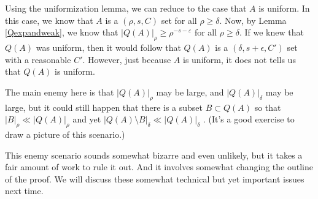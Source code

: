 \documentclass[12pt]{amsart}
\begin{document}
Using the uniformization lemma,  we can reduce to the case that $A$ is uniform.   In this case,  we know that $A$ is a $(\rho, s, C)$ set for all $\rho \ge \delta$.   Now,  by Lemma \ref{Qexpandweak},  we know that
$|Q(A)|_\rho \geq \rho^{-s-\varepsilon}$ for all $\rho \ge \delta$.   If we knew that $Q(A)$ was uniform,  then it would follow that $Q(A)$ is a $(\delta,  s+ \epsilon, C')$ set with a reasonable $C'$.   However,  just because $A$ is uniform,  it does not tells us that $Q(A)$ is uniform.   

The main enemy here is that $|Q(A)|_\rho$ may be large,  and $|Q(A)|_\delta$ may be large,  but it could still happen that there is a subset $B \subset Q(A)$ so that $|B|_\rho \ll |Q(A)|_\rho$  and yet $|Q(A) \setminus B|_\delta \ll |Q(A)|_\delta$ .   (It's a good exercise to draw a picture of this scenario.)

This enemy scenario sounds somewhat bizarre and even unlikely,  but it takes a fair amount of work to rule it out.   And it involves somewhat changing the outline of the proof.  We will discuss these somewhat technical but yet important issues next time.   





\end{document}
